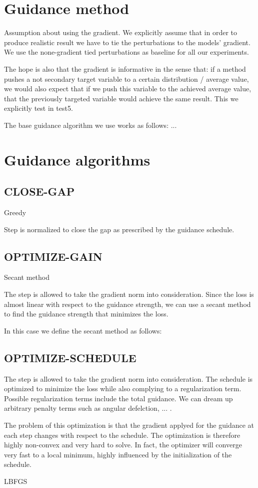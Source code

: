 \section{Guidance method}

Assumption about using the gradient.
We explicitly assume that in order to produce realistic result we have to tie the perturbations to the models' gradient.
We use the none-gradient tied perturbations as baseline for all our experiments.

The hope is also that the gradient is informative in the sense that:
if a method pushes a not secondary target variable to a certain distribution / average value, we would also expect that if we push this variable to the achieved average value, that the previously targeted variable would achieve the same result.
This we explicitly test in test5.

The base guidance algorithm we use works as follows:
...



\section{Guidance algorithms}

\subsection{CLOSE-GAP}

Greedy

Step is normalized to close the gap as prescribed by the guidance schedule.

\subsection{OPTIMIZE-GAIN}

Secant method

The step is allowed to take the gradient norm into consideration.
Since the loss is almost linear with respect to the guidance strength, we can use a secant method to find the guidance strength that minimizes the loss.

In this case we define the secant method as follows:


\subsection{OPTIMIZE-SCHEDULE}

The step is allowed to take the gradient norm into consideration.
The schedule is optimized to minimize the loss while also complying to a regularization term.
Possible regularization terms include the total guidance.
We can dream up arbitrary penalty terms such as angular defelction, ... .

The problem of this optimization is that the gradient applyed for the guidance at each step changes with respect to the schedule.
The optimization is therefore highly non-convex and very hard to solve.
In fact, the optimizer will converge very fast to a local minimum, highly influenced by the initialization of the schedule.

LBFGS